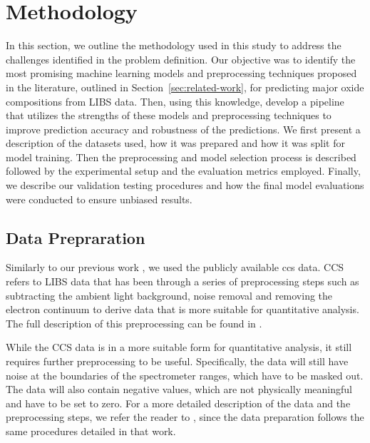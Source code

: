 \section{Methodology}\label{sec:methodology}
In this section, we outline the methodology used in this study to address the challenges identified in the problem definition. Our objective was to identify the most promising machine learning models and preprocessing techniques proposed in the literature, outlined in Section~\ref{sec:related-work}, for predicting major oxide compositions from LIBS data. 
Then, using this knowledge, develop a pipeline that utilizes the strengths of these models and preprocessing techniques to improve prediction accuracy and robustness of the predictions.
We first present a description of the datasets used, how it was prepared and how it was split for model training. Then the preprocessing and model selection process is described followed by the experimental setup and the evaluation metrics employed. Finally, we describe our validation testing procedures and how the final model evaluations were conducted to ensure unbiased results.

\subsection{Data Prepraration}
Similarly to our previous work \cite{p9}, we used the publicly available \gls{ccs} data. 
CCS refers to LIBS data that has been through a series of preprocessing steps such as subtracting the ambient light background, noise removal and removing the electron continuum to derive data that is more suitable for quantitative analysis. 
The full description of this preprocessing can be found in \citet{wiensPreFlight3}.

While the CCS data is in a more suitable form for quantitative analysis, it still requires further preprocessing to be useful. Specifically, the data will still have noise at the boundaries of the spectrometer ranges, which have to be masked out. The data will also contain negative values, which are not physically meaningful and have to be set to zero.
For a more detailed description of the data and the preprocessing steps, we refer the reader to \citet{p9}, since the data preparation follows the same procedures detailed in that work.

